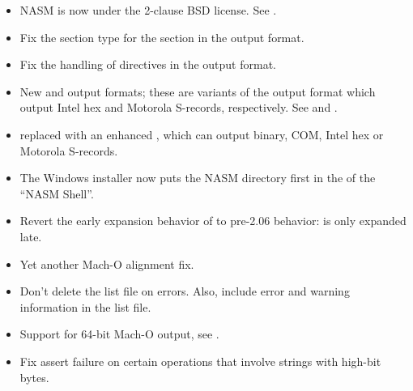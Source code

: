 \begin{itemize}
    \item{NASM is now under the 2-clause BSD license. See .}
    \item{Fix the section type for the  section in the 
        output format.}
    \item{Fix the handling of  directives in the  output format.}
    \item{New  and  output formats; these are variants of the
         output format which output Intel hex and Motorola S-records,
        respectively. See  and .}
    \item{ replaced with an enhanced , which can output
        binary, COM, Intel hex or Motorola S-records.}
    \item{The Windows installer now puts the NASM directory first in the
         of the ``NASM Shell''.}
    \item{Revert the early expansion behavior of \code{\%+} to
        pre-2.06 behavior: \code{\%+} is only expanded late.}
    \item{Yet another Mach-O alignment fix.}
    \item{Don't delete the list file on errors. Also, include error and
        warning information in the list file.}
    \item{Support for 64-bit Mach-O output, see .}
    \item{Fix assert failure on certain operations that involve strings with
        high-bit bytes.}
\end{itemize}


